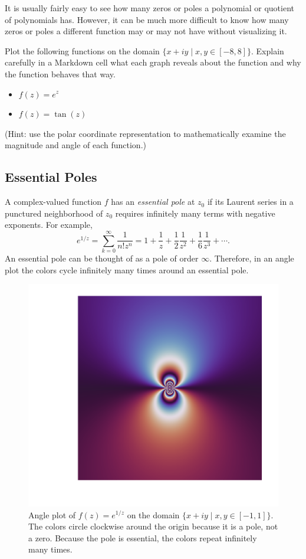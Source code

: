It is usually fairly easy to see how many zeros or poles a polynomial or quotient of polynomials has.
However, it can be much more difficult to know how many zeros or poles a different function may or may not have without visualizing it.

\begin{problem}
\label{prob:findpz}
Plot the following functions on the domain $\{x+iy\mid x,y\in[-8,8]\}$.
Explain carefully in a Markdown cell what each graph reveals about the function and why the function behaves that way.
\begin{itemize}
\item $f(z) = e^z$
\item $f(z) = \tan(z)$
\end{itemize}
(Hint: use the polar coordinate representation to mathematically examine the magnitude and angle of each function.)
\end{problem}

\subsection*{Essential Poles} %

A complex-valued function $f$ has an \emph{essential pole} at $z_0$ if its Laurent series in a punctured neighborhood of $z_0$ requires infinitely many terms with negative exponents.
For example,
\[
e^{1/z} = \sum_{k=0}^{\infty}\frac{1}{n! z^n} = 1+\frac{1}{z}+\frac{1}{2}\frac{1}{z^2}+\frac{1}{6}\frac{1}{z^3}+\cdots.
\]
An essential pole can be thought of as a pole of order $\infty$.
Therefore, in an angle plot the colors cycle infinitely many times around an essential pole.

\begin{figure}[H] %
\includegraphics[width=.7\textwidth]{figures/poles_angle.png}
\caption{Angle plot of $f(z) = e^{1/z}$ on the domain $\{x+iy \mid x,y \in [-1,1]\}$.
The colors circle clockwise around the origin because it is a pole, not a zero.
Because the pole is essential, the colors repeat infinitely many times.}
\label{fig:complex-essential-pole}
\end{figure}

